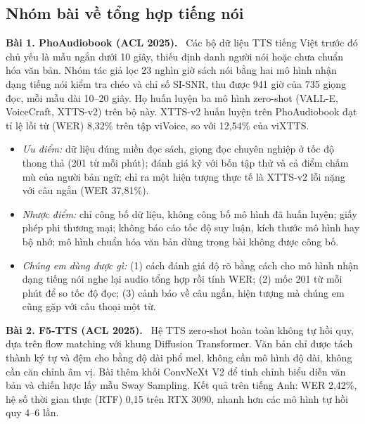 \documentclass[12pt,a4paper]{article}
\providecommand{\tightlist}{\setlength{\itemsep}{2pt}\setlength{\parskip}{0pt}}
\begin{document}
\subsection{Nhóm bài về tổng hợp tiếng nói}

\textbf{Bài 1. PhoAudiobook (ACL 2025).}~\cite{b1} Các bộ dữ liệu TTS tiếng Việt trước đó chủ yếu là mẫu ngắn dưới 10 giây, thiếu định danh người nói hoặc chưa chuẩn hóa văn bản. Nhóm tác giả lọc 23 nghìn giờ sách nói bằng hai mô hình nhận dạng tiếng nói kiểm tra chéo và chỉ số SI-SNR, thu được 941 giờ của 735 giọng đọc, mỗi mẫu dài 10--20 giây. Họ huấn luyện ba mô hình zero-shot (VALL-E, VoiceCraft, XTTS-v2) trên bộ này. XTTS-v2 huấn luyện trên PhoAudiobook đạt tỉ lệ lỗi từ (WER) 8,32\% trên tập viVoice, so với 12,54\% của viXTTS.

\begin{itemize}
\tightlist
\item
  \emph{Ưu điểm:} dữ liệu đúng miền đọc sách, giọng đọc chuyên nghiệp ở tốc độ thong thả (201 từ mỗi phút); đánh giá kỹ với bốn tập thử và cả điểm chấm mù của người bản ngữ; chỉ ra một hiện tượng thực tế là XTTS-v2 lỗi nặng với câu ngắn (WER 37,81\%).
\item
  \emph{Nhược điểm:} chỉ công bố dữ liệu, không công bố mô hình đã huấn luyện; giấy phép phi thương mại; không báo cáo tốc độ suy luận, kích thước mô hình hay bộ nhớ; mô hình chuẩn hóa văn bản dùng trong bài không được công bố.
\item
  \emph{Chúng em dùng được gì:} (1) cách đánh giá độ rõ bằng cách cho mô hình nhận dạng tiếng nói nghe lại audio tổng hợp rồi tính WER; (2) mốc 201 từ mỗi phút để so tốc độ đọc; (3) cảnh báo về câu ngắn, hiện tượng mà chúng em cũng gặp với câu thoại một từ.
\end{itemize}

\textbf{Bài 2. F5-TTS (ACL 2025).}~\cite{b2} Hệ TTS zero-shot hoàn toàn không tự hồi quy, dựa trên flow matching với khung Diffusion Transformer. Văn bản chỉ được tách thành ký tự và đệm cho bằng độ dài phổ mel, không cần mô hình độ dài, không cần căn chỉnh âm vị. Bài thêm khối ConvNeXt V2 để tinh chỉnh biểu diễn văn bản và chiến lược lấy mẫu Sway Sampling. Kết quả trên tiếng Anh: WER 2,42\%, hệ số thời gian thực (RTF) 0,15 trên RTX 3090, nhanh hơn các mô hình tự hồi quy 4--6 lần.
\end{document}
